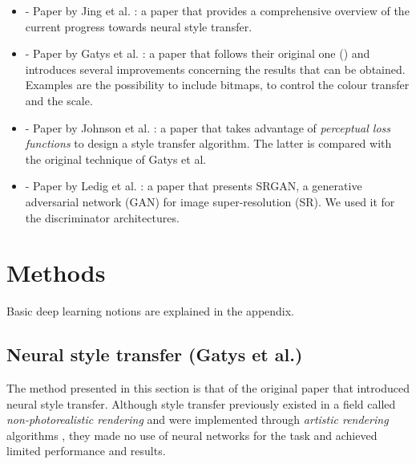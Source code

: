 \documentclass[twocolumn,superscriptaddress,aps,floatfix, nofootinbib]{revtex4-1}
\begin{document}
    \begin{itemize}
        \item \cite{DBLP:journals/corr/JingYFYS17} - Paper by Jing et al. :  a paper that provides a comprehensive overview of the current progress towards neural style transfer.
        \item \cite{DBLP:journals/corr/GatysEBHS16} - Paper by Gatys et al. : a paper that follows their original one (\cite{DBLP:journals/corr/GatysEB15a}) and introduces several improvements concerning the results that can be obtained. Examples are the possibility to include bitmaps, to control the colour transfer and the scale.
        \item \cite{DBLP:journals/corr/JohnsonAL16} - Paper by Johnson et al. : a paper that takes advantage of \emph{perceptual loss functions} to design a style transfer algorithm. The latter is compared with the original technique of Gatys et al.
        \item \cite{DBLP:journals/corr/LedigTHCATTWS16} - Paper by Ledig et al. : a paper that presents SRGAN, a generative adversarial network (GAN) for image super-resolution (SR). We used it for the discriminator architectures.
    \end{itemize}
    
    
    
    
    \section{Methods}
    
    Basic deep learning notions are explained in the appendix.
    
    \subsection{Neural style transfer (Gatys et al.)}\label{sec:methods.gatys}
    
    The method presented in this section is that of the original paper that introduced neural style transfer. Although style transfer previously existed in a field called \emph{non-photorealistic rendering} and were implemented through \emph{artistic rendering} algorithms \cite{DBLP:journals/corr/JingYFYS17}, they made no use of neural networks for the task and achieved limited performance and results.\\
    
\end{document}
